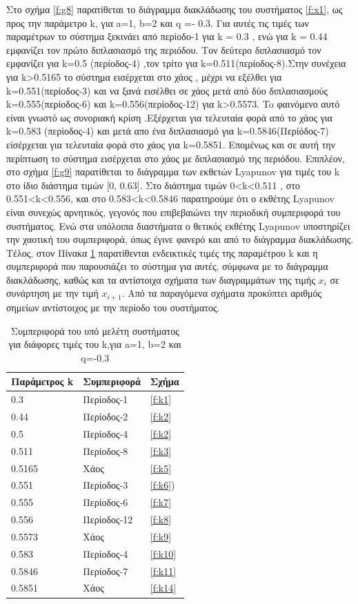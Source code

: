 Στο σχήμα \ref{f:g8} παρατίθεται το διάγραμμα διακλάδωσης του συστήματος \ref{f:x1}, ως προς την παράμετρο k, για a=1, b=2 και q =- 0.3. Για αυτές τις τιμές των παραμέτρων το σύστημα ξεκινάει από περίοδο-1 για k = 0.3 , ενώ για  k = 0.44 εμφανίζει τον πρώτο διπλασιασμό της περιόδου. Τον δεύτερο διπλασιασμό τον εμφανίζει για k=0.5 (περίοδος-4) ,τον τρίτο για k=0.511(περίοδος-8).Στην συνέχεια για k>0.5165 το σύστημα εισέρχεται στο χάος , μέχρι να εξέλθει  για k=0.551(περίοδος-3) και να ξανά εισέλθει σε χάος μετά από δύο διπλασιασμούς k=0.555(περίοδος-6) και k=0.556(περίοδος-12) για k>0.5573. To φαινόμενο αυτό είναι γνωστό ως συνοριακή κρίση .Εξέρχεται για τελευταία φορά από το χάος για k=0.583 (περίοδος-4) και μετά απο ένα διπλασιασμό  για k=0.5846(Περίόδος-7) είσέρχεται για τελευταία φορά στο χάος για k=0.5851.
Επομένως και σε αυτή την περίπτωση το σύστημα εισέρχεται στο χάος με διπλασιασμό της περιόδου. 
Επιπλέον, στο σχήμα \ref{f:g9} παρατίθεται το διάγραμμα των εκθετών Lyapunov για τιμές του k στο ίδιο διάστημα τιμών [0, 0.63].  Στο διάστημα τιμών   0<k<0.511 , στο 0.551<k<0.556, και στο 0.583<k<0.5846 παρατηρούμε ότι ο εκθέτης Lyapunov είναι συνεχώς αρνητικός, γεγονός που επιβεβαιώνει την περιοδική συμπεριφορά του συστήματος. Ενώ στα υπόλοιπα διαστήματα ο θετικός εκθέτης Lyapunov υποστηρίζει την χαοτική του συμπεριφορά, όπως έγινε φανερό και από το διάγραμμα διακλάδωσης.
Τέλος, στον Πίνακα \ref{tab:abc1} παρατίθενται ενδεικτικές τιμές της παραμέτρου k και η συμπεριφορά που παρουσιάζει το σύστημα για αυτές, σύμφωνα με το διάγραμμα διακλάδωσης, καθώς και τα αντίστοιχα σχήματα των διαγραμμάτων της τιμής \(x_i\) σε συνάρτηση με την τιμή \(x_{i+1}\). Από τα παραγόμενα σχήματα προκύπτει αριθμός σημείων αντίστοιχος με την περίοδο του συστήματος.
\begin{table}[h!]
	\centering
	\begin{tabular}{l | l | l}
		Παράμετρος k & Συμπεριφορά & Σχήμα\\
		\hline
		0.3 &  Περίοδος-1 & \ref{f:k1}\\
		0.44& Περίοδος-2 & \ref{f:k2}\\
		0.5& Περίοδος-4 & \ref{f:k2}\\
		0.511 &  Περίοδος-8 & \ref{f:k3}\\
		0.5165 & Χάος & \ref{f:k5}\\
		0.551 & Περίοδος-3 & \ref{f:k6})\\
		0.555 & Περίοδος-6 & \ref{f:k7}\\
		0.556 & Περίοδος-12 & \ref{f:k8}\\
		0.5573 & Χάος & \ref{f:k9}\\
		0.583& Περίοδος-4 & \ref{f:k10}\\
		0.5846 & Περίοδος-7 & \ref{f:k11}\\
		0.5851 & Χάος & \ref{f:k14}\\
	\end{tabular}
	\caption{ Συμπεριφορά του υπό μελέτη συστήματος για διάφορες τιμές του k,για a=1, b=2 και q=-0.3}
	\label{tab:abc1}
\end{table}

